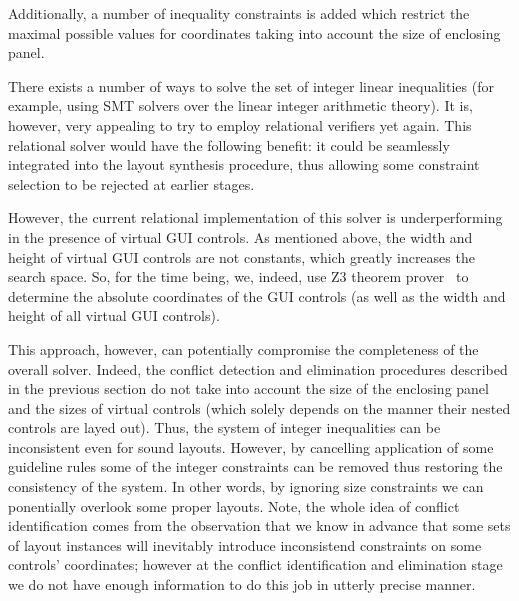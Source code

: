 Additionally, a number of inequality constraints is added which restrict the maximal possible values for
coordinates taking into account the size of enclosing panel.


There exists a number of ways to solve the set of integer linear inequalities (for example, using SMT solvers over the linear
integer arithmetic theory). It is, however, very appealing to try to employ relational verifiers yet again. This relational
solver would have the following benefit: it could be seamlessly integrated into the layout synthesis procedure, thus allowing some
constraint selection to be rejected at earlier stages.

However, the current relational implementation of this solver is underperforming in the presence of virtual GUI controls.
As mentioned above, the width and height of virtual GUI controls are not constants, which greatly increases the
search space. So, for the time being, we, indeed, use \textsc{Z3} theorem prover~\cite{Zthree} to determine the
absolute coordinates of the GUI controls (as well as the width and height of all virtual GUI controls).

This approach, however, can potentially compromise the completeness of the overall solver. Indeed, the conflict
detection and elimination procedures described in the previous section do not take into account the size of the
enclosing panel and the sizes of virtual controls (which solely depends on the manner their nested controls are
layed out). Thus, the system of integer inequalities can be inconsistent even for sound layouts. However,
by cancelling application of some guideline rules some of the integer constraints can be removed thus restoring
the consistency of the system. In other words, by ignoring size constraints we can ponentially overlook some
proper layouts. Note, the whole idea of conflict identification comes from the observation that we know
in advance that some sets of layout instances will inevitably introduce inconsistend constraints on
some controls' coordinates; however at the conflict identification and elimination stage we do not have
enough information to do this job in utterly precise manner.

